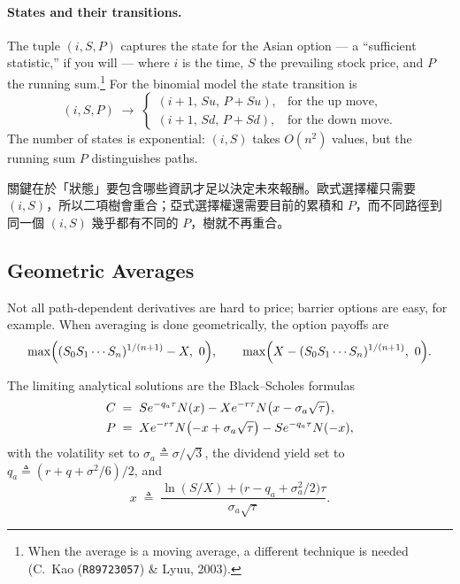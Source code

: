 \suppstart
{}
\suppend

\paragraph{States and their transitions.}
The tuple $(i,S,P)$ captures the state for the Asian option --- a ``sufficient statistic,'' if you will --- where $i$ is the time, $S$ the prevailing stock price, and $P$ the running sum.\footnote{When the average is a moving average, a different technique is needed (C.~Kao (\texttt{R89723057}) \& Lyuu, 2003).}
For the binomial model the state transition is
\[
	(i,S,P) \;\longrightarrow\;
	\begin{cases}
		(i+1,\,Su,\,P+Su), & \text{for the up move},   \\
		(i+1,\,Sd,\,P+Sd), & \text{for the down move}.
	\end{cases}
\]
The number of states is exponential: $(i,S)$ takes $O(n^{2})$ values, but the running sum $P$ distinguishes paths.

\suppstart
{}

\begin{remark}
	關鍵在於「狀態」要包含哪些資訊才足以決定未來報酬。歐式選擇權只需要 $(i,S)$，所以二項樹會重合；亞式選擇權還需要目前的累積和 $P$，而不同路徑到同一個 $(i,S)$ 幾乎都有不同的 $P$，樹就不再重合。
\end{remark}
\suppend

\subsection{Geometric Averages}


Not all path-dependent derivatives are hard to price; barrier options are easy, for example.
When averaging is done geometrically, the option payoffs are
\[
	\max\Bigl((S_{0}S_{1}\cdots S_{n})^{1/(n+1)}-X,\ 0\Bigr) ,
	\qquad
	\max\Bigl(X-(S_{0}S_{1}\cdots S_{n})^{1/(n+1)},\ 0\Bigr) .
\]

\begin{theorem}[Angus, 1999]
	\label{thm:geometric-asian}
	The limiting analytical solutions are the Black--Scholes formulas
	\begin{align}
		C & \;=\; Se^{-q_{a}\tau}N(x)-Xe^{-r\tau}N\bigl(x-\sigma_{a}\sqrt{\tau}\bigr) , \label{eq:geo-call} \\
		P & \;=\; Xe^{-r\tau}N\bigl(-x+\sigma_{a}\sqrt{\tau}\bigr)-Se^{-q_{a}\tau}N(-x) , \notag
	\end{align}
	with the volatility set to $\sigma_{a}\triangleq\sigma/\sqrt{3}$, the dividend yield set to $q_{a}\triangleq(r+q+\sigma^{2}/6)/2$, and
	\[
		x \;\triangleq\; \frac{\ln(S/X)+\bigl(r-q_{a}+\sigma_{a}^{2}/2\bigr)\tau}{\sigma_{a}\sqrt{\tau}} .
	\]
\end{theorem}

